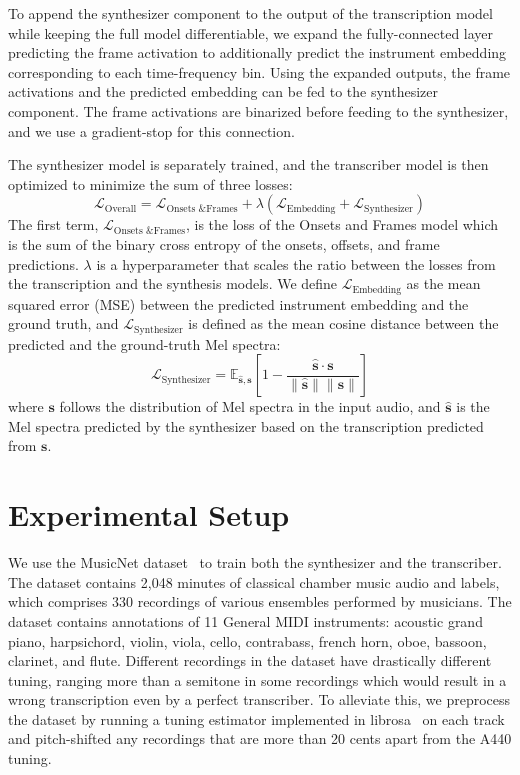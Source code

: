 To append the synthesizer component to the output of the transcription model while keeping the full model differentiable, we expand the fully-connected layer predicting the frame activation to additionally predict the instrument embedding corresponding to each time-frequency bin.
Using the expanded outputs, the frame activations and the predicted embedding can be fed to the synthesizer component.
The frame activations are binarized before feeding to the synthesizer, and we use a gradient-stop for this connection.

The synthesizer model is separately trained, and the transcriber model is then optimized to minimize the sum of three losses:
\begin{equation}\label{eqn:overall-loss}
\mathcal{L}_{\text{Overall}} = \mathcal{L}_{\text{Onsets \& Frames}} + \lambda \left ( \mathcal{L}_{\text{Embedding}} + \mathcal{L}_{\text{Synthesizer}} \right )
\end{equation}
The first term, $\mathcal{L}_{\text{Onsets \& Frames}}$, is the loss of the Onsets and Frames model which is the sum of the binary cross entropy of the onsets, offsets, and frame predictions.
$\lambda$ is a hyperparameter that scales the ratio between the losses from the transcription and the synthesis models.
We define $\mathcal{L}_{\text{Embedding}}$ as the mean squared error (MSE) between the predicted instrument embedding and the ground truth, and $\mathcal{L}_{\text{Synthesizer}}$ is defined as the mean cosine distance between the predicted and the ground-truth Mel spectra:
\begin{equation}\label{eqn:cosine-distance-loss}
\mathcal{L}_{\text{Synthesizer}} = \mathbb{E}_{\hat{\mathbf{s}}, \mathbf{s}} \left [ 1 - \frac{ \hat{\mathbf{s}} \cdot \mathbf{s} }{\lVert \hat{\mathbf{s}} \rVert \lVert \mathbf{s} \rVert} \right ]
\end{equation}
where $\mathbf{s}$ follows the distribution of Mel spectra in the input audio, and $\hat{\mathbf{s}}$ is the Mel spectra predicted by the synthesizer based on the transcription predicted from $\mathbf{s}$.

\section{Experimental Setup}

We use the MusicNet dataset~\cite{thickstun2017musicnet} to train both the synthesizer and the transcriber.
The dataset contains 2,048 minutes of classical chamber music audio and labels, which comprises 330 recordings of various ensembles performed by musicians.
The dataset contains annotations of 11 General MIDI instruments: acoustic grand piano, harpsichord, violin, viola, cello, contrabass, french horn, oboe, bassoon, clarinet, and flute.
Different recordings in the dataset have drastically different tuning, ranging more than a semitone in some recordings which would result in a wrong transcription even by a perfect transcriber.
To alleviate this, we preprocess the dataset by running a tuning estimator implemented in librosa~\cite{mcfee2015librosa} on each track and pitch-shifted any recordings that are more than 20 cents apart from the A440 tuning.

